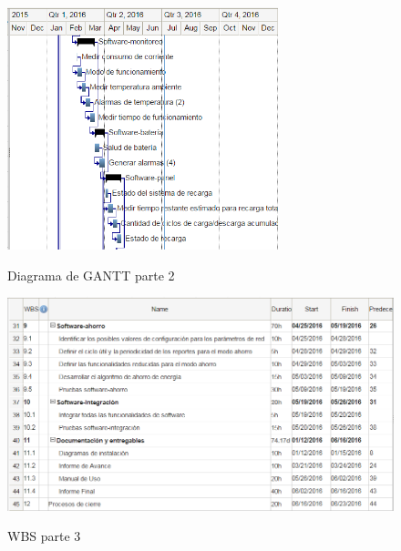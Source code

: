\begin{figure}[h!]
	\centering
    \includegraphics[width=0.7\textwidth]{./Figures/gantt2.PNG}
	\label{fig:gantt2}
	\caption{Diagrama de GANTT parte 2}
\end{figure}

\begin{figure}[h!]
	\centering
    \includegraphics[width=1\textwidth]{./Figures/WBS3.PNG}
	\label{fig:WBS3}
	\caption{WBS parte 3}
\end{figure}

